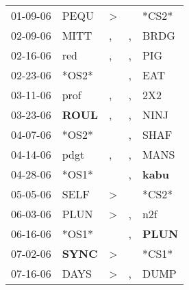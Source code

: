 \begin{supertabular}{p{0.07\textwidth}p{0.06\textwidth}p{0.02\textwidth}p{0.02\textwidth}p{0.06\textwidth}}
          01-09-06\textsuperscript{} &           PEQU\textsuperscript{} &     \textgreater &                  &                            *CS2* \\
          02-09-06\textsuperscript{} &           MITT\textsuperscript{} &                , &                , &           BRDG\textsuperscript{} \\
          02-16-06\textsuperscript{} &            red\textsuperscript{} &                , &                , &            PIG\textsuperscript{} \\
          02-23-06\textsuperscript{} &                            *OS2* &                  &                , &            EAT\textsuperscript{} \\
          03-11-06\textsuperscript{} &           prof\textsuperscript{} &                , &                , &            2X2\textsuperscript{} \\
          03-23-06\textsuperscript{} &  \textbf{ROUL\textsuperscript{}} &                , &                , &           NINJ\textsuperscript{} \\
          04-07-06\textsuperscript{} &                            *OS2* &                  &                , &           SHAF\textsuperscript{} \\
          04-14-06\textsuperscript{} &           pdgt\textsuperscript{} &                , &                , &           MANS\textsuperscript{} \\
          04-28-06\textsuperscript{} &                            *OS1* &                  &                , &  \textbf{kabu\textsuperscript{}} \\
          05-05-06\textsuperscript{} &           SELF\textsuperscript{} &     \textgreater &                  &                            *CS2* \\
          06-03-06\textsuperscript{} &           PLUN\textsuperscript{} &     \textgreater &                , &            n2f\textsuperscript{} \\
          06-16-06\textsuperscript{} &                            *OS1* &                  &                , &  \textbf{PLUN\textsuperscript{}} \\
          07-02-06\textsuperscript{} &  \textbf{SYNC\textsuperscript{}} &     \textgreater &                  &                            *CS1* \\
          07-16-06\textsuperscript{} &           DAYS\textsuperscript{} &     \textgreater &                , &           DUMP\textsuperscript{} \\

\end{supertabular}
